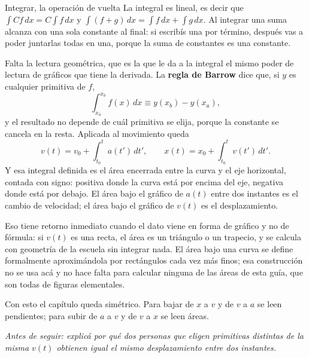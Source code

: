 \documentclass[11pt,openany]{book}
\begin{document}
\begin{bloque}{Integrar, la operación de vuelta}
La integral es lineal, es decir que $\int C f\,dx = C\int f\,dx$ y $\int (f+g)\,dx = \int f\,dx + \int g\,dx$. Al integrar una suma alcanza con una sola constante al final: si escribís una por término, después vas a poder juntarlas todas en una, porque la suma de constantes es una constante.

Falta la lectura geométrica, que es la que le da a la integral el mismo poder de lectura de gráficos que tiene la derivada. La \textbf{regla de Barrow} dice que, si $y$ es cualquier primitiva de $f$,
\[
\int_{x_a}^{x_b} f(x)\,dx \equiv y(x_b) - y(x_a),
\]
y el resultado no depende de cuál primitiva se elija, porque la constante se cancela en la resta. Aplicada al movimiento queda
\[
v(t) = v_0 + \int_{t_0}^{t} a(t')\,dt', \qquad x(t) = x_0 + \int_{t_0}^{t} v(t')\,dt'.
\]
Y esa integral definida es el área encerrada entre la curva y el eje horizontal, contada con signo: positiva donde la curva está por encima del eje, negativa donde está por debajo. El área bajo el gráfico de $a(t)$ entre dos instantes es el cambio de velocidad; el área bajo el gráfico de $v(t)$ es el desplazamiento.

Eso tiene retorno inmediato cuando el dato viene en forma de gráfico y no de fórmula: si $v(t)$ es una recta, el área es un triángulo o un trapecio, y se calcula con geometría de la escuela sin integrar nada. El área bajo una curva se define formalmente aproximándola por rectángulos cada vez más finos; esa construcción no se usa acá y no hace falta para calcular ninguna de las áreas de esta guía, que son todas de figuras elementales.

Con esto el capítulo queda simétrico. Para bajar de $x$ a $v$ y de $v$ a $a$ se leen pendientes; para subir de $a$ a $v$ y de $v$ a $x$ se leen áreas.

\begin{center}
\end{center}

\textit{Antes de seguir: explicá por qué dos personas que eligen primitivas distintas de la misma $v(t)$ obtienen igual el mismo desplazamiento entre dos instantes.}
\end{bloque}
\end{document}
